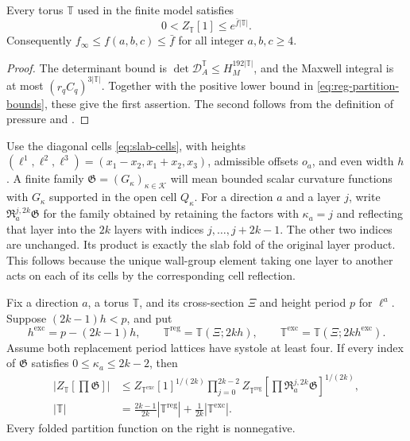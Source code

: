 \begin{lemma}\label{lem:uniform-ceiling}
Every torus $\mathbb T$ used in the finite model satisfies
\[
 0<Z_{\mathbb T}[1]\le e^{\bar f|\mathbb T|}.
\]
Consequently $f_\infty\le f(a,b,c)\le\bar f$ for all integer
$a,b,c\ge4$.
\end{lemma}

\begin{proof}
The determinant bound is $\det\mathcal D_A^{\mathbb T}
\le H_M^{192|\mathbb T|}$, and the Maxwell integral is at most
$(r_qC_q)^{3|\mathbb T|}$. Together with the positive lower bound
in \eqref{eq:reg-partition-bounds}, these give the first assertion.
The second follows from the definition of pressure and
.
\end{proof}

Use the diagonal cells \eqref{eq:slab-cells}, with heights
$(\ell^1,\ell^2,\ell^3)=(x_1-x_2,x_1+x_2,x_3)$, admissible
offsets $o_a$, and even width $h$. A finite family
$\mathfrak G=(G_\kappa)_{\kappa\in\mathcal K}$ will mean bounded
scalar curvature functions with $G_\kappa$ supported in the open
cell $Q_\kappa$. For a direction $a$ and a layer $j$, write
$\mathfrak R_a^{j,2k}\mathfrak G$ for the family obtained by retaining
the factors with $\kappa_a=j$ and reflecting that layer into the
$2k$ layers with indices $j,\ldots,j+2k-1$. The other two indices
are unchanged. Its product is exactly the slab fold of the original
layer product. This follows because the unique wall-group element
taking one layer to another acts on each of its cells by the
corresponding cell reflection.

\begin{lemma}\label{lem:one-step}
Fix a direction $a$, a torus $\mathbb T$, and its cross-section $\Xi$
and height period $p$ for $\ell^a$. Suppose $(2k-1)h<p$, and put
\[
 h^{\mathrm{exc}}=p-(2k-1)h,\qquad
 \mathbb T^{\mathrm{reg}}=\mathbb T(\Xi;2kh),\qquad
 \mathbb T^{\mathrm{exc}}=\mathbb T(\Xi;2kh^{\mathrm{exc}}).
\]
Assume both replacement period lattices have systole at least four.
If every index of $\mathfrak G$ satisfies $0\le\kappa_a\le2k-2$,
then
\begin{align}
 \left|Z_{\mathbb T}[\prod\mathfrak G]\right|
 &\le Z_{\mathbb T^{\mathrm{exc}}}[1]^{1/(2k)}
    \prod_{j=0}^{2k-2}
      Z_{\mathbb T^{\mathrm{reg}}}
       [\prod\mathfrak R_a^{j,2k}\mathfrak G]^{1/(2k)},
       \label{eq:sides-step}\\
 |\mathbb T|
 &=\frac{2k-1}{2k}|\mathbb T^{\mathrm{reg}}|
     +\frac1{2k}|\mathbb T^{\mathrm{exc}}|.
       \label{eq:sides-step-volumes}
\end{align}
Every folded partition function on the right is nonnegative.
\end{lemma}

